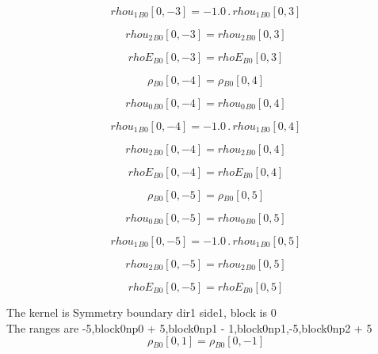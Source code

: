 \documentclass{article}
\begin{document}
\begin{dmath}{rhou_{1}{_{B0}}}[{0,-3}] = - 1.0 \,.\, {rhou_{1}{_{B0}}}[{0,3}]\end{dmath}

\begin{dmath}{rhou_{2}{_{B0}}}[{0,-3}] = {rhou_{2}{_{B0}}}[{0,3}]\end{dmath}

\begin{dmath}{rhoE{_{B0}}}[{0,-3}] = {rhoE{_{B0}}}[{0,3}]\end{dmath}

\begin{dmath}{\rho{_{B0}}}[{0,-4}] = {\rho{_{B0}}}[{0,4}]\end{dmath}

\begin{dmath}{rhou_{0}{_{B0}}}[{0,-4}] = {rhou_{0}{_{B0}}}[{0,4}]\end{dmath}

\begin{dmath}{rhou_{1}{_{B0}}}[{0,-4}] = - 1.0 \,.\, {rhou_{1}{_{B0}}}[{0,4}]\end{dmath}

\begin{dmath}{rhou_{2}{_{B0}}}[{0,-4}] = {rhou_{2}{_{B0}}}[{0,4}]\end{dmath}

\begin{dmath}{rhoE{_{B0}}}[{0,-4}] = {rhoE{_{B0}}}[{0,4}]\end{dmath}

\begin{dmath}{\rho{_{B0}}}[{0,-5}] = {\rho{_{B0}}}[{0,5}]\end{dmath}

\begin{dmath}{rhou_{0}{_{B0}}}[{0,-5}] = {rhou_{0}{_{B0}}}[{0,5}]\end{dmath}

\begin{dmath}{rhou_{1}{_{B0}}}[{0,-5}] = - 1.0 \,.\, {rhou_{1}{_{B0}}}[{0,5}]\end{dmath}

\begin{dmath}{rhou_{2}{_{B0}}}[{0,-5}] = {rhou_{2}{_{B0}}}[{0,5}]\end{dmath}

\begin{dmath}{rhoE{_{B0}}}[{0,-5}] = {rhoE{_{B0}}}[{0,5}]\end{dmath}

\noindent The kernel is Symmetry boundary dir1 side1, block is 0\\\noindent The ranges are -5,block0np0 + 5,block0np1 - 1,block0np1,-5,block0np2 + 5\\\begin{dmath}{\rho{_{B0}}}[{0,1}] = {\rho{_{B0}}}[{0,-1}]\end{dmath}
\end{document}
